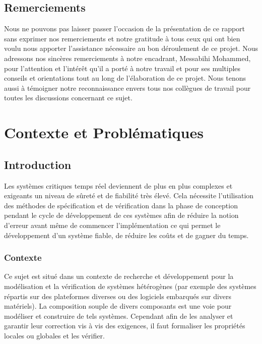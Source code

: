 \documentclass[french]{spimufcphdthesis}
\begin{document}
 

\chapter*{Remerciements}
Nous ne pouvons pas laisser passer l’occasion de la présentation de ce rapport sans exprimer nos remerciements et notre gratitude à tous ceux qui ont bien voulu nous apporter l’assistance nécessaire au bon déroulement de ce projet.
Nous adressons nos sincères remerciements à notre encadrant, Messabihi Mohammed, pour l’attention et l’intérêt qu’il a porté à notre travail et pour ses multiples conseils et orientations tout au long de l'élaboration de ce projet.
Nous tenons aussi à témoigner notre reconnaissance envers tous nos collègues de travail pour toutes les discussions concernant ce sujet.

\tableofcontents


\mainmatter
 
\part{Contexte et Problématiques}
\chapter{Introduction}

 Les systèmes critiques temps réel deviennent de plus en plus complexes et exigeants un niveau de sûreté et de fiabilité très élevé. Cela nécessite l'utilisation des méthodes de spécification et de vérification dans la phase de conception pendant le cycle de développement de ces systèmes afin de réduire la notion d'erreur avant même de commencer l'implémentation ce qui permet le développement d'un système fiable, de réduire les coûts et de gagner du temps.
 
 
\section{Contexte}

Ce sujet est situé dans un contexte de recherche et développement pour la modélisation et la vérification
de  systèmes  hétérogènes  (par  exemple  des  systèmes  répartis  sur  des  plateformes  diverses  ou  des
logiciels  embarqués  sur  divers  matériels).   La  composition  souple  de  divers  composants  est  une
voie pour modéliser et construire de tels systèmes.  Cependant afin de les analyser et garantir leur
correction vis à vis des exigences, il faut formaliser les propriétés locales ou globales et les vérifier.
\end{document}
